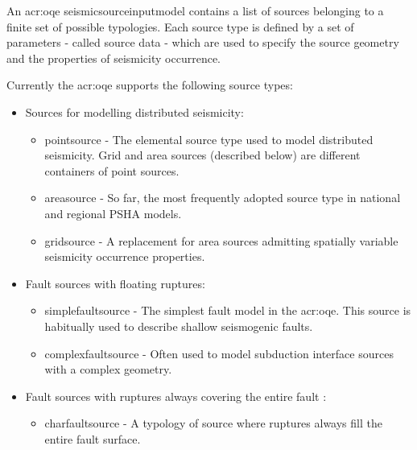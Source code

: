 An \glsdesc{acr:oqe} \gls{seismicsourceinputmodel} contains a list of sources
belonging to a finite set of possible typologies. Each source type is defined
by a set of parameters - called source data - which are used to specify the
source geometry and the properties of seismicity occurrence.

Currently the \glsdesc{acr:oqe} supports the following source types:

\begin{itemize}

    \item Sources for modelling distributed seismicity:

    \begin{itemize}

        \item \Gls{pointsource} - The elemental source type used to model
        distributed seismicity. Grid and area sources (described below) are
        different containers of point sources.

        \item \Gls{areasource} - So far, the most frequently adopted source
        type in national and regional PSHA models.

        \item \Gls{gridsource} - A replacement for area sources admitting
        spatially variable seismicity occurrence properties.

    \end{itemize}

    \item Fault sources with floating ruptures:

    \begin{itemize}

        \item \Gls{simplefaultsource} - The simplest fault model in the
        \glsdesc{acr:oqe}. This source is habitually used to describe shallow
        seismogenic faults.

        \item \Gls{complexfaultsource} - Often used to model subduction
        interface sources with a complex geometry.

    \end{itemize}

    \item Fault sources with ruptures always covering the entire fault
    \surface:

    \begin{itemize}

        \item \Gls{charfaultsource} - A typology of source where ruptures
        always fill the entire fault surface.

    \end{itemize}

\end{itemize}

